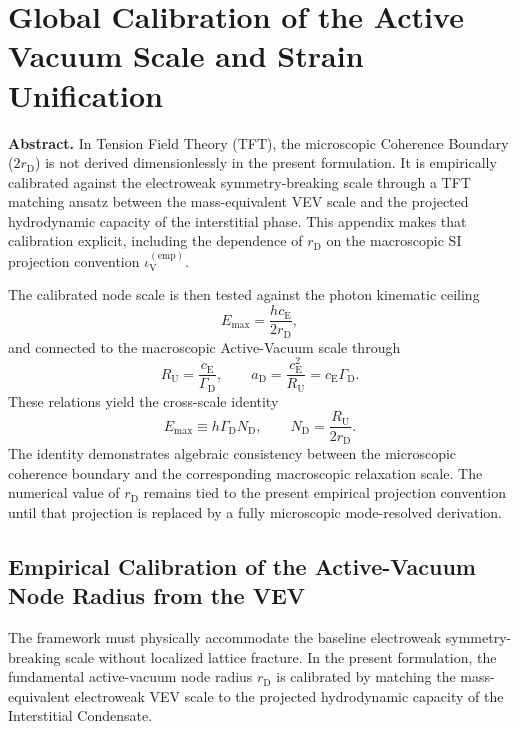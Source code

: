 \chapter{Global Calibration of the Active Vacuum Scale and Strain Unification}
\label{app:vacuum_scale_strain_unification}

\noindent\textbf{Abstract.}
In Tension Field Theory (TFT), the microscopic Coherence Boundary
($2r_{\mathrm D}$) is not derived dimensionlessly in the present formulation.
It is empirically calibrated against the electroweak symmetry-breaking scale
through a TFT matching ansatz between the mass-equivalent VEV scale and the
projected hydrodynamic capacity of the interstitial phase. This appendix makes
that calibration explicit, including the dependence of $r_{\mathrm D}$ on the
macroscopic SI projection convention $\iota_{\mathrm V}^{(\mathrm{emp})}$.

The calibrated node scale is then tested against the photon kinematic ceiling
\[
    E_{\mathrm{max}}
    =
    \frac{hc_{\mathrm E}}{2r_{\mathrm D}},
\]
and connected to the macroscopic Active-Vacuum scale through
\[
    R_{\mathrm U}
    =
    \frac{c_{\mathrm E}}{\Gamma_{\mathrm D}},
    \qquad
    a_{\mathrm D}
    =
    \frac{c_{\mathrm E}^{2}}{R_{\mathrm U}}
    =
    c_{\mathrm E}\Gamma_{\mathrm D}.
\]
These relations yield the cross-scale identity
\[
    E_{\mathrm{max}}
    \equiv
    h\Gamma_{\mathrm D}N_{\mathrm D},
    \qquad
    N_{\mathrm D}
    =
    \frac{R_{\mathrm U}}{2r_{\mathrm D}}.
\]
The identity demonstrates algebraic consistency between the microscopic
coherence boundary and the corresponding macroscopic relaxation scale. The
numerical value of $r_{\mathrm D}$ remains tied to the present empirical
projection convention until that projection is replaced by a fully microscopic
mode-resolved derivation.


\section{Empirical Calibration of the Active-Vacuum Node Radius from the VEV}
\label{sec:vev_calibration}

The framework must physically accommodate the baseline electroweak
symmetry-breaking scale without localized lattice fracture. In the present
formulation, the fundamental active-vacuum node radius $r_{\mathrm D}$ is
calibrated by matching the mass-equivalent electroweak VEV scale to the
projected hydrodynamic capacity of the Interstitial Condensate.

